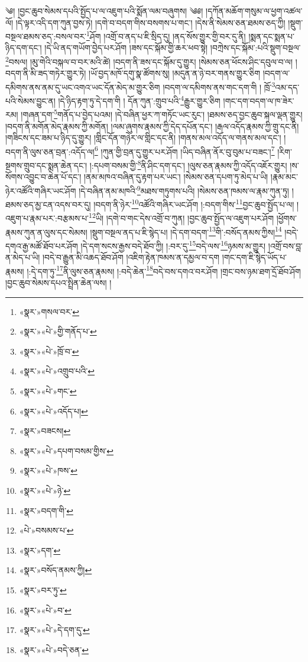 ༄། །བྱང་ཆུབ་སེམས་དཔའི་སྤྱོད་པ་ལ་འཇུག་པའི་སྨོན་ལམ་བཞུགས། ༄༅། །དཀོན་མཆོག་གསུམ་ལ་ཕྱག་འཚལ་ལོ། །དེ་ལྟར་འདི་དག་ཀུན་བྱས་ཏེ། །དགེ་བ་བདག་གིས་བསགས་པ་གང་། །དེས་ནི་སེམས་ཅན་ཐམས་ཅད་ཀྱི། །སྡུག་བསྔལ་ཐམས་ཅད་:བསལ་བར་\footnote{«སྣར་»གསལ་བར་}ཤོག །འགྲོ་བ་ནད་པ་ཇི་སྲིད་དུ། །ནད་སོས་གྱུར་གྱི་བར་དུ་ནི། །སྨན་དང་སྨན་པ་ཉིད་དག་དང་། །དེ་ཡི་ནད་གཡོག་བྱེད་པར་ཤོག །ཟས་དང་སྐོམ་གྱི་ཆར་ཕབ་སྟེ། །བཀྲེས་དང་སྐོམ་:པའི་སྡུག་བསྔལ་\footnote{«སྣར་»«པེ་»གྱི་གནོད་པ་}བསལ། །མུ་གེའི་བསྐལ་བ་བར་མའི་ཚེ། །བདག་ནི་ཟས་དང་སྐོམ་དུ་གྱུར། །སེམས་ཅན་ཕོངས་ཤིང་དབུལ་བ་ལ། །བདག་ནི་མི་ཟད་གཏེར་གྱུར་ཏེ། །ཡོ་བྱད་མཁོ་དགུ་སྣ་ཚོགས་སུ། །མདུན་ན་ཉེ་བར་གནས་གྱུར་ཅིག །བདག་ལ་དམིགས་ནས་ནམ་དུ་ཡང་འགའ་ཡང་དོན་མེད་མ་གྱུར་ཅིག །བདག་ལ་དམིགས་ནས་གང་དག་གི ། ཁྲོ་\footnote{«སྣར་»«པེ་»ཁྲོ་བ་}འམ་དད་པའི་སེམས་བྱུང་ན། །དེ་ཉིད་རྟག་ཏུ་དེ་དག་གི ། དོན་ཀུན་:གྲུབ་པའི་\footnote{«སྣར་»«པེ་»འགྲུབ་པའི་}རྒྱུར་གྱུར་ཅིག །གང་དག་བདག་ལ་ཁ་ཟེར་རམ། །གཞན་དག་\footnote{«སྣར་»«པེ་»གང་}གནོད་པ་བྱེད་པའམ། །དེ་བཞིན་ཕྱར་ཀ་གཏོང་ཡང་རུང་། །ཐམས་ཅད་བྱང་ཆུབ་སྐལ་ལྡན་གྱུར། །བདག་ནི་མགོན་མེད་རྣམས་ཀྱི་མགོན། །ལམ་ཞུགས་རྣམས་ཀྱི་དེད་དཔོན་དང་། །རྒལ་འདོད་རྣམས་ཀྱི་གྲུ་དང་ནི། །གཟིངས་དང་ཟམ་པ་ཉིད་དུ་གྱུར། །གླིང་དོན་གཉེར་ལ་གླིང་དང་ནི། །གནས་མལ་འདོད་ལ་གནས་མལ་དང་། །བདག་ནི་ལུས་ཅན་བྲན་:འདོད་ལ།\footnote{«སྣར་»«པེ་»འདོད་པ།} །ཀུན་གྱི་བྲན་དུ་གྱུར་པར་ཤོག །ཡིད་བཞིན་ནོར་བུ་བུམ་པ་བཟང་།\footnote{«སྣར་»བཟངས།} །རིག་སྔགས་གྲུབ་དང་སྨན་ཆེན་དང་། །:དཔག་བསམ་གྱི་\footnote{«སྣར་»«པེ་»དཔག་བསམ་གྱིས་}ནི་ཤིང་དག་དང་། །ལུས་ཅན་རྣམས་ཀྱི་འདོད་འཇོར་གྱུར། །ས་སོགས་འབྱུང་བ་ཆེན་པོ་དང་། །ནམ་མཁའ་བཞིན་དུ་རྟག་པར་ཡང་། །སེམས་ཅན་དཔག་ཏུ་མེད་པ་ཡི། །རྣམ་མང་ཉེར་འཚོའི་གཞིར་ཡང་ཤོག །དེ་བཞིན་ནམ་མཁའི་\footnote{«སྣར་»«པེ་»ཁས་}མཐས་གཏུགས་པའི། །སེམས་ཅན་ཁམས་ལ་རྣམ་ཀུན་ཏུ། །ཐམས་ཅད་མྱ་ངན་འདས་བར་དུ། །བདག་ནི་ཉེར་\footnote{«སྣར་»«པེ་»ཉེ་}འཚོའི་གཞིར་ཡང་ཤོག །:བདག་གིས་\footnote{«སྣར་»བདག་གི་}བྱང་ཆུབ་སྤྱོད་པ་ལ། །འཇུག་པ་རྣམ་པར་:བརྩམས་པ་\footnote{«པེ་»བསམས་པ་}ཡི། །དགེ་བ་གང་དེས་འགྲོ་བ་ཀུན། །བྱང་ཆུབ་སྤྱོད་ལ་འཇུག་པར་ཤོག །ཕྱོགས་རྣམས་ཀུན་ན་ལུས་དང་སེམས། །སྡུག་བསྔལ་ནད་པ་ཇི་སྙེད་པ། །དེ་དག་བདག་\footnote{«སྣར་»དག་}གི་:བསོད་ནམས་ཀྱིས།\footnote{«སྣར་»བསོད་ནམས་ཀྱི།} །བདེ་དགའ་རྒྱ་མཚོ་ཐོབ་པར་ཤོག །དེ་དག་སངས་རྒྱས་བདེ་ཐོབ་ཀྱི། །:བར་དུ་\footnote{«སྣར་»བར་ཏུ་}བདེ་ལས་\footnote{«སྣར་»«པེ་»བ་}ཉམས་མ་གྱུར། །འགྲོ་བས་བླ་ན་མེད་པ་ཡི། །བདེ་བ་རྒྱུན་མི་འཆད་ཐོབ་ཤོག །འཇིག་རྟེན་ཁམས་ན་དམྱལ་བ་དག །གང་དག་ཇི་སྙེད་ཡོད་པ་རྣམས། །:དེ་དག་ཏུ་\footnote{«སྣར་»«པེ་»དེ་དག་དུ་}ནི་ལུས་ཅན་རྣམས། །:བདེ་ཆེན་\footnote{«སྣར་»«པེ་»བདེ་ཅན་}བདེ་བས་དགའ་བར་ཤོག །གྲང་བས་ཉམ་ཐག་དྲོ་ཐོབ་ཤོག །བྱང་ཆུབ་སེམས་དཔའ་སྤྲིན་ཆེན་ལས། །
